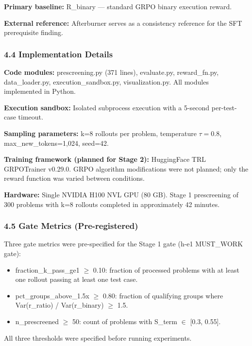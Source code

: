\textbf{Primary baseline:} R\_binary --- standard GRPO binary execution reward.

\textbf{External reference:} Afterburner \citep{Du2025} serves as a consistency reference for the SFT prerequisite finding.

\subsubsection{4.4 Implementation Details}

\textbf{Code modules:} prescreening.py (371 lines), evaluate.py, reward\_fn.py, data\_loader.py, execution\_sandbox.py, visualization.py. All modules implemented in Python.

\textbf{Execution sandbox:} Isolated subprocess execution with a 5-second per-test-case timeout.

\textbf{Sampling parameters:} k=8 rollouts per problem, temperature $\tau =0.8$, max\_new\_tokens=1,024, seed=42.

\textbf{Training framework (planned for Stage 2):} HuggingFace TRL GRPOTrainer v0.29.0. GRPO algorithm modifications were not planned; only the reward function was varied between conditions.

\textbf{Hardware:} Single NVIDIA H100 NVL GPU (80 GB). Stage 1 prescreening of 300 problems with k=8 rollouts completed in approximately 42 minutes.

\subsubsection{4.5 Gate Metrics (Pre-registered)}

Three gate metrics were pre-specified for the Stage 1 gate (h-e1 MUST\_WORK gate):

\begin{itemize}
\item fraction\_k\_pass\_ge1 $\geq$ 0.10: fraction of processed problems with at least one rollout passing at least one test case.
\item pct\_groups\_above\_1.5x $\geq$ 0.80: fraction of qualifying groups where Var(r\_ratio) / Var(r\_binary) $\geq$ 1.5.
\item n\_prescreened $\geq$ 50: count of problems with S\_term $\in$ [0.3, 0.55].
\end{itemize}

All three thresholds were specified before running experiments.

